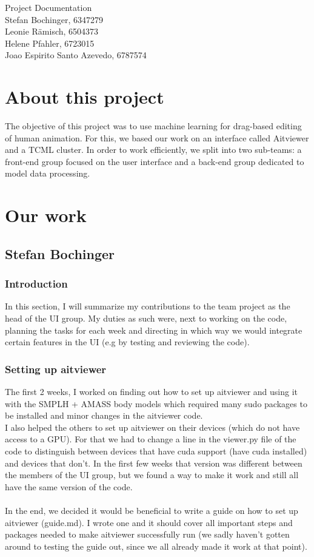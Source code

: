 \documentclass[a4paper]{scrartcl}
\def\header#1#2{
  \begin{center}
    {\Large Project Documentation}\\
    {Stefan Bochinger, 6347279}\\
    {Leonie Rämisch, 6504373}\\
    {Helene Pfahler, 6723015}\\
    {Joao Espirito Santo Azevedo, 6787574}
  \end{center}
}
\begin{document}
\header{Nr. \NUMBER}{\DEADLINE}

\section*{About this project}
The objective of this project was to use machine learning for drag-based editing of human animation. For this, we based our work on an interface called Aitviewer and a TCML cluster. 
In order to work efficiently, we split into two sub-teams: a front-end group focused on the user interface and a back-end group dedicated to model data processing.  

\section*{Our work}

\subsection*{Stefan Bochinger}
\subsubsection*{Introduction}
In this section, I will summarize my contributions to the team project as the head of the UI group. My duties as such were, next to working on the code, planning the tasks for each week and directing in which way we would integrate certain features in the UI (e.g by testing and reviewing the code).

\subsubsection*{Setting up aitviewer}
The first 2 weeks, I worked on finding out how to set up aitviewer and using it with the SMPLH + AMASS body models which required many sudo packages to be installed and minor changes in the aitviewer code.\\
I also helped the others to set up aitviewer on their devices (which do not have access to a GPU). For that we had to change a line in the viewer.py file of the code to distinguish between devices that have cuda support (have cuda installed) and devices that don't. In the first few weeks that version was different between the members of the UI group, but we found a way to make it work and still all have the same version of the code.\\\\
In the end, we decided it would be beneficial to write a guide on how to set up aitviewer (guide.md). I wrote one and it should cover all important steps and packages needed to make aitviewer successfully run (we sadly haven't gotten around to testing the guide out, since we all already made it work at that point).
\end{document}

